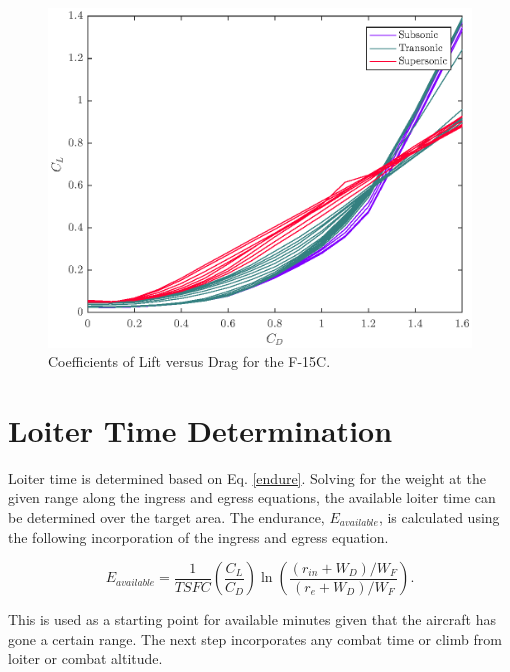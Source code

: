 \begin{figure}[H]
    \centering
    \includegraphics{Thesis/Method/DragPolar.eps}%
    \caption{Coefficients of Lift versus Drag for the F-15C.}%
    \label{fig:machSpeedByGroup}%
\end{figure}
\section{Loiter Time Determination}
Loiter time is determined based on Eq. \ref{endure}. Solving for the weight at the given range along the ingress and egress equations, the available loiter time can be determined over the target area. The endurance, $E_{available}$, is calculated using the following incorporation of the ingress and egress equation.

\begin{equation}
    E_{available} = \dfrac{1}{TSFC}\left(\dfrac{C_L}{C_D}\right)\ln\left(\dfrac{(r_{in}+ W_D)/W_F}{(r_{e}+W_D)/W_F}\right).
\end{equation}

This is used as a starting point for available minutes given that the aircraft has gone a certain range. The next step incorporates any combat time or climb from loiter or combat altitude. 

